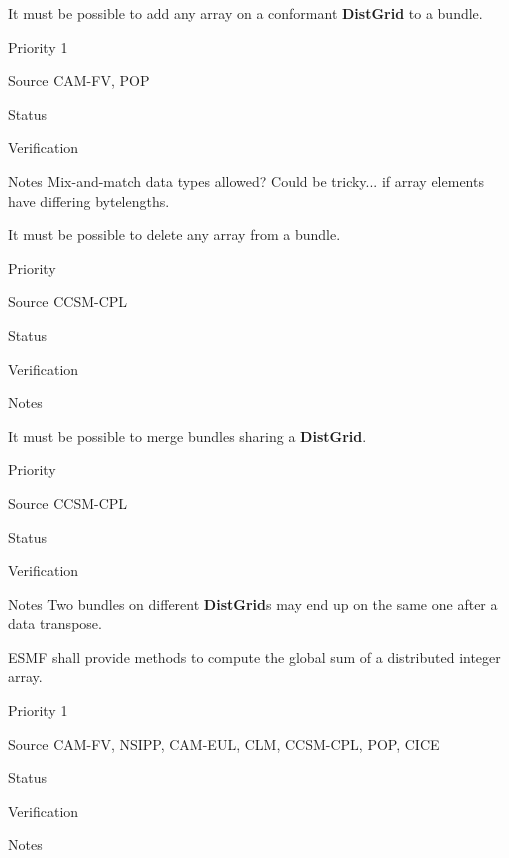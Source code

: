 It must be possible to add any array on a conformant \textbf{DistGrid}
to a bundle.

\begin{reqlist}
\item[Priority] 1
\item[Source] CAM-FV, POP
\item[Status]
\item[Verification]
\item[Notes] Mix-and-match data types allowed? Could be tricky... if
  array elements have differing bytelengths.
\end{reqlist}


It must be possible to delete any array from a bundle.

\begin{reqlist}
\item[Priority]
\item[Source] CCSM-CPL
\item[Status]
\item[Verification]
\item[Notes]
\end{reqlist}


It must be possible to merge bundles sharing a \textbf{DistGrid}.

\begin{reqlist}
\item[Priority]
\item[Source] CCSM-CPL
\item[Status]
\item[Verification]
\item[Notes] Two bundles on different \textbf{DistGrid}s may end up on the same
  one after a data transpose.
\end{reqlist}



ESMF shall provide methods to compute the global sum of a distributed
integer array.

\begin{reqlist}
\item[Priority] 1
\item[Source] CAM-FV, NSIPP, CAM-EUL, CLM, CCSM-CPL, POP, CICE
\item[Status]
\item[Verification]
\item[Notes] 
\end{reqlist}


